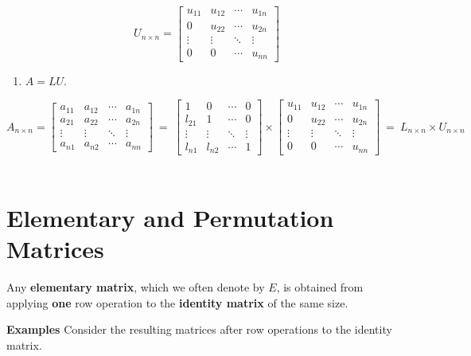\documentclass[
]{book}
\providecommand{\tightlist}{%
  \setlength{\itemsep}{0pt}\setlength{\parskip}{0pt}}
\begin{document}
\[
U_{n\times n} = \left[\begin{array}{ccccc} 
u_{11} & u_{12} & \cdots & u_{1n}  \\ 
0 & u_{22} & \cdots & u_{2n}  \\ 
\vdots & \vdots & \ddots & \vdots  \\
0 & 0 & \cdots & u_{nn}  
\end{array}
\right]
\]

\begin{enumerate}
\def\labelenumi{\arabic{enumi}.}
\setcounter{enumi}{2}
\tightlist
\item
  \(A = LU\).
\end{enumerate}

\[
A_{n\times n} = \left[\begin{array}{ccccc} 
a_{11} & a_{12} & \cdots & a_{1n}  \\ 
a_{21} & a_{22} & \cdots & a_{2n}  \\ 
\vdots & \vdots & \ddots & \vdots  \\
a_{n1} & a_{n2} & \cdots & a_{nn}  
\end{array}
\right]
~
=~
\left[\begin{array}{ccccc} 
1 & 0 & \cdots & 0  \\ 
l_{21} & 1 & \cdots & 0  \\ 
\vdots & \vdots & \ddots & \vdots  \\
l_{n1} & l_{n2} & \cdots & 1  
\end{array}
\right]
\times
\left[\begin{array}{ccccc} 
u_{11} & u_{12} & \cdots & u_{1n}  \\ 
0 & u_{22} & \cdots & u_{2n}  \\ 
\vdots & \vdots & \ddots & \vdots  \\
0 & 0 & \cdots & u_{nn}  
\end{array}
\right]
~=~
L_{n\times n}\times U_{n\times n}
\]\\

\hypertarget{elementary-and-permutation-matrices}{%
\section{Elementary and Permutation Matrices}\label{elementary-and-permutation-matrices}}

Any \textbf{elementary matrix}, which we often denote by \(E\), is obtained from applying \textbf{one} row operation to the \textbf{identity matrix} of the same size.

\textbf{Examples} Consider the resulting matrices after row operations to the identity matrix.
\end{document}
